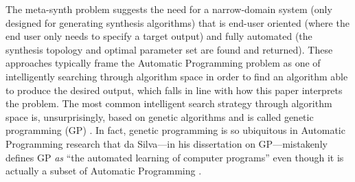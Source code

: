 \documentclass[a4paper,12pt]{report} 	%
\numberwithin{figure}{chapter}
\numberwithin{table}{chapter}
\numberwithin{equation}{chapter}
\begin{document}
\begin{flushleft}
The meta-synth problem suggests the need for a narrow-domain system (only designed for generating synthesis algorithms) that is end-user oriented (where the end user only needs to specify a target output) and fully automated (the synthesis topology and optimal parameter set are found and returned). These approaches typically frame the Automatic Programming problem as one of intelligently searching through algorithm space in order to find an algorithm able to produce the desired output, which falls in line with how this paper interprets the problem. The most common intelligent search strategy through algorithm space is, unsurprisingly, based on genetic algorithms and is called genetic programming (GP) \cite{Koza:1992gp}. In fact, genetic programming is so ubiquitous in Automatic Programming research that da Silva---in his dissertation on GP---mistakenly defines GP \emph{as} ``the automated learning of computer programs'' even though it is actually a subset of Automatic Programming \cite[p. ix]{Silva:2008le}.


\end{flushleft}
\end{document}
